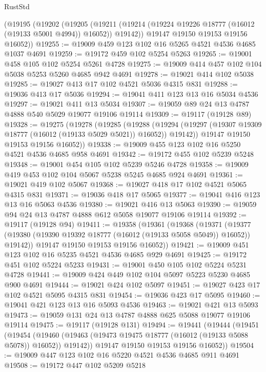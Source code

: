 \begin{lexlean}{RustStd}
\begin{coremodule}
    (@19195
      (@19202
        (@19205
          (@19211 (@19214 (@19224 @19226 @18777 (@16012 (@19133 @5001 @4994)) @16052)) @19142))
        @19147
        @19150
        @19153
        @19156
        @16052))
@19255 := @19009 @459 @123 @102 @16 @5265 @4521 @4536 @4685 @1037 @4691
@19259 := @19172 @459 @102 @5254 @5263
@19265 := @19001 @458 @105 @102 @5254 @5261 @4728
@19275 := @19009 @414 @457 @102 @104 @5038 @5253 @5260 @4685 @942 @4691
@19278 := @19021 @414 @102 @5038
@19285 := @19027 @413 @17 @102 @4521 @5036 @4315 @831
@19288 := @19036 @413 @17 @5036
@19294 := @19041 @411 @123 @13 @16 @5034 @4536
@19297 := @19021 @411 @13 @5034
@19307 := @19059 @89 @24 @13 @4787 @4888 @540 @5029 @19077 @19106 @19114
@19309 := @19117 (@19128 @89)
@19328 := @19275
    (@19278
      (@19285
        (@19288
          (@19294 (@19297 (@19307 @19309 @18777 (@16012 (@19133 @5029 @5021)) @16052)) @19142))
        @19147
        @19150
        @19153
        @19156
        @16052))
@19338 := @19009 @455 @123 @102 @16 @5250 @4521 @4536 @4685 @958 @4691
@19342 := @19172 @455 @102 @5239 @5248
@19348 := @19001 @454 @105 @102 @5239 @5246 @4728
@19358 := @19009 @419 @453 @102 @104 @5067 @5238 @5245 @4685 @924 @4691
@19361 := @19021 @419 @102 @5067
@19368 := @19027 @418 @17 @102 @4521 @5065 @4315 @831
@19371 := @19036 @418 @17 @5065
@19377 := @19041 @416 @123 @13 @16 @5063 @4536
@19380 := @19021 @416 @13 @5063
@19390 := @19059 @94 @24 @13 @4787 @4888 @612 @5058 @19077 @19106 @19114
@19392 := @19117 (@19128 @94)
@19411 := @19358
    (@19361
      (@19368
        (@19371
          (@19377 (@19380 (@19390 @19392 @18777 (@16012 (@19133 @5058 @5049)) @16052)) @19142))
        @19147
        @19150
        @19153
        @19156
        @16052))
@19421 := @19009 @451 @123 @102 @16 @5235 @4521 @4536 @4685 @929 @4691
@19425 := @19172 @451 @102 @5224 @5233
@19431 := @19001 @450 @105 @102 @5224 @5231 @4728
@19441 := @19009 @424 @449 @102 @104 @5097 @5223 @5230 @4685 @900 @4691
@19444 := @19021 @424 @102 @5097
@19451 := @19027 @423 @17 @102 @4521 @5095 @4315 @831
@19454 := @19036 @423 @17 @5095
@19460 := @19041 @421 @123 @13 @16 @5093 @4536
@19463 := @19021 @421 @13 @5093
@19473 := @19059 @131 @24 @13 @4787 @4888 @625 @5088 @19077 @19106 @19114
@19475 := @19117 (@19128 @131)
@19494 := @19441
    (@19444
      (@19451
        (@19454
          (@19460 (@19463 (@19473 @19475 @18777 (@16012 (@19133 @5088 @5078)) @16052)) @19142))
        @19147
        @19150
        @19153
        @19156
        @16052))
@19504 := @19009 @447 @123 @102 @16 @5220 @4521 @4536 @4685 @911 @4691
@19508 := @19172 @447 @102 @5209 @5218

\end{coremodule}
\end{lexlean}

